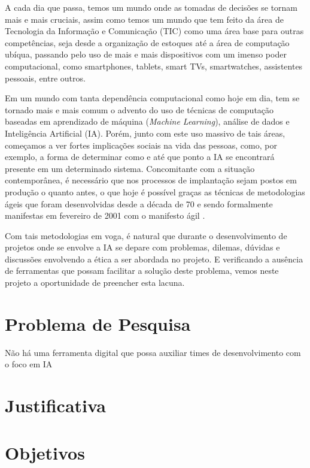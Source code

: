 \label{introducao}

A cada dia que passa, temos um mundo onde as tomadas de decisões se tornam mais e mais cruciais, assim como temos um mundo que tem feito da área de Tecnologia da Informação e Comunicação (TIC) como uma área base para outras competências, seja desde a organização de estoques até a área de computação ubíqua, passando pelo uso de mais e mais dispositivos com um imenso poder computacional, como smartphones, tablets, smart TVs, smartwatches, assistentes pessoais, entre outros. 

Em um mundo com tanta dependência computacional como hoje em dia, tem se tornado mais e mais comum o advento do uso de técnicas de computação baseadas em aprendizado de máquina (\textit{Machine Learning}), análise de dados e Inteligência Artificial (IA). Porém, junto com este uso massivo de tais áreas, começamos a ver fortes implicações sociais na vida das pessoas, como, por exemplo, a forma de determinar como e até que ponto a \acrshort{IA} se encontrará presente em um determinado sistema. Concomitante com a situação contemporânea, é necessário que nos processos de implantação sejam postos em produção o quanto antes, o que hoje é possível graças as técnicas de metodologias ágeis que foram desenvolvidas desde a década de 70 e sendo formalmente manifestas em fevereiro de 2001 com o manifesto ágil \cite{agilemanifesto}. 

Com tais metodologias em voga, é natural que durante o desenvolvimento de projetos onde se envolve a \acrshort{IA} se depare com problemas, dilemas, dúvidas e discussões envolvendo a ética a ser abordada no projeto. E verificando a ausência de ferramentas que possam facilitar a solução deste problema, vemos neste projeto a oportunidade de preencher esta lacuna.



\section{Problema de Pesquisa}
Não há uma ferramenta digital que possa auxiliar times de desenvolvimento com o foco em \acrshort{IA}

\section{Justificativa}


\section{Objetivos}



